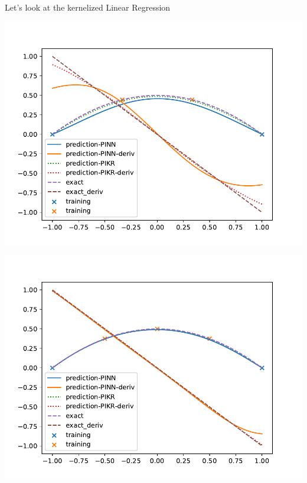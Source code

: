 \documentclass[aspectratio=169]{beamer}
\begin{document}
\begin{frame}{Let's look at the kernelized Linear Regression}
  \centering
  \begin{minipage}{0.3\textwidth}
    \includegraphics[width=\textwidth]{pinn-4.pdf}
  \end{minipage}%
  \begin{minipage}{0.3\textwidth}
    \includegraphics[width=\textwidth]{pinn-5.pdf}
  \end{minipage}%
  \begin{minipage}{0.3\textwidth}

\end{minipage}
\end{frame}
\end{document}
